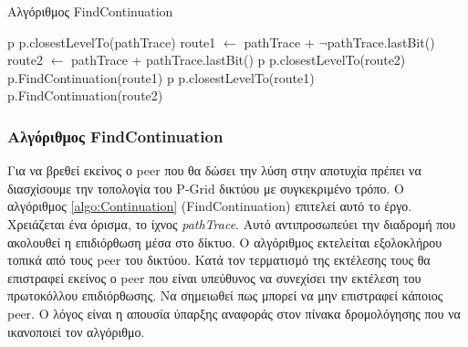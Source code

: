 \begin{algorithm}[htbp]
\caption{Αλγόριθμος FindContinuation}
\label{algo:Continuation}
\begin{algorithmic}[1]
         \label{code:Check1}
            \State \Return p
        \EndIf
         \label{code:Check2}
            \State \Return p.closestLevelTo(pathTrace)
        \EndIf
        \State route1 $\gets$ pathTrace + $\neg$pathTrace.lastBit() \label{code:PathRoute1}
        \State route2 $\gets$ pathTrace + pathTrace.lastBit() \label{code:PathRoute2}
         \label{code:CheckRoute1}
             \label{code:Route1Equiv}
                 \label{code:Route1EquivConPeer}
                    \State \Return p
                \Else \label{code:Route1EquivConSubtree}
                    \State \Return p.closestLevelTo(route2)
                \EndIf
            \Else \label{code:Route1Subtrees}
                \State \Return p.FindContinuation(route1)
            \EndIf
         \label{code:CheckRoute2}
             \label{code:Route2Equiv}
                 \label{code:Route2EquivConPeer}
                    \State \Return p
                \Else \label{code:Route2EquivConSubtree}
                    \State \Return p.closestLevelTo(route1)
                \EndIf
            \Else \label{code:Route2Subtrees}
                \State \Return p.FindContinuation(route2)
            \EndIf
        \EndIf

    \EndProcedure
\end{algorithmic}
\end{algorithm}

\subsubsection{Αλγόριθμος FindContinuation}

Για να βρεθεί εκείνος ο peer που θα δώσει την λύση στην αποτυχία πρέπει 
να διασχίσουμε την τοπολογία του P-Grid δικτύου με συγκεκριμένο τρόπο. Ο 
αλγόριθμος \ref{algo:Continuation} (FindContinuation) επιτελεί αυτό το έργο. 
Χρειάζεται ένα όρισμα, το ίχνος \textit{pathTrace}. Αυτό αντιπροσωπεύει την 
διαδρομή που ακολουθεί η επιδιόρθωση μέσα στο δίκτυο. Ο αλγόριθμος εκτελείται 
εξολοκλήρου τοπικά από τους peer του δικτύου. Κατά τον τερματισμό της εκτέλεσης 
τους θα επιστραφεί εκείνος ο peer που είναι υπεύθυνος να συνεχίσει την εκτέλεση 
του πρωτοκόλλου επιδιόρθωσης. Να σημειωθεί πως μπορεί να μην επιστραφεί κάποιος 
peer. Ο λόγος είναι η απουσία ύπαρξης αναφοράς στον πίνακα δρομολόγησης που 
να ικανοποιεί τον αλγόριθμο.

